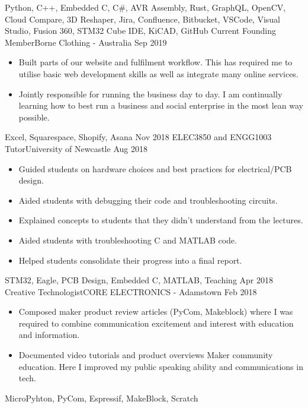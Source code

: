 \begin{experiences}
{\begin{itemize}
			\end{itemize}
		}
		{Python, C++, Embedded C, C\#, AVR Assembly, Rust, GraphQL, OpenCV, Cloud Compare, 3D Reshaper, Jira, Confluence, Bitbucket, VSCode, Visual Studio, Fusion 360, STM32 Cube IDE, KiCAD, GitHub}
	\emptySeparator
	\experience
		{Current}	{Founding Member}{Borne Clothing - Australia}
		{Sep 2019}	{
			\begin{itemize}
				\item Built parts of our website and fulfilment workflow. This has required me to utilise basic web development skills as well as integrate many online services.
				\item Jointly responsible for running the business day to day. I am continually learning how to best run a business and social enterprise in the most lean way possible.
			\end{itemize}
		}
		{Excel, Squarespace, Shopify, Asana}
	\emptySeparator
	\experience
		{Nov 2018}	{ELEC3850 and ENGG1003 Tutor}{University of Newcastle}
		{Aug 2018}	{
			\begin{itemize}
				\item Guided students on hardware choices and best practices for electrical/PCB design.
				\item Aided students with debugging their code and troubleshooting circuits.
				\item Explained concepts to students that they didn't understand from the lectures.
				\item Aided students with troubleshooting C and MATLAB code.
				\item Helped students consolidate their progress into a final report.
			\end{itemize}
		}
		{STM32, Eagle, PCB Design, Embedded C, MATLAB, Teaching}
	\emptySeparator
	\experience
		{Apr 2018}    {Creative Technologist}{CORE ELECTRONICS - Adamstown}
		{Feb 2018}    {
			\begin{itemize}
				\item Composed maker product review articles (PyCom, Makeblock) where I was required to combine communication excitement and interest with education and information.
				\item Documented video tutorials and product overviews Maker community education. Here I improved my public speaking ability and communications in tech.
			\end{itemize}
		}
		{MicroPyhton, PyCom, Espressif, MakeBlock, Scratch}
	\end{experiences}
